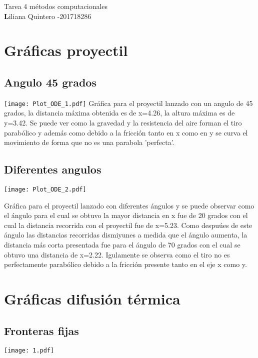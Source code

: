 \documentclass[a4paper,11pt]{article}
\begin{document}
\begin{center}
{\Large Tarea 4 m\'etodos computacionales} \\
{\textbf Liliana Quintero -201718286}
\end{center}


\noindent
\section{Gr\'aficas proyectil}

\subsection{Angulo 45 grados}

\begin{center}
\texttt{[image: Plot\_ODE\_1.pdf]} 
Gr\'afica para el proyectil lanzado con un angulo de 45 grados, la distancia m\'axima obtenida es de x=4.26, la altura m\'axima es de y=3.42. Se puede ver como la gravedad y la resistencia del aire forman el tiro parab\'olico y adem\'as como debido a la fricci\'on tanto en x como en y se curva el movimiento de forma que no es una parabola 'perfecta'.
\end{center}

\subsection{Diferentes angulos}

\begin{center}
\texttt{[image: Plot\_ODE\_2.pdf]}
\end{center}
Gr\'afica para el proyectil lanzado con diferentes \'angulos y se puede observar como el \'angulo para el cual se obtuvo la mayor distancia en x fue de 20 grados con el cual la distancia recorrida con el proyectil fue de x=5.23. Como despu\'ues de este \'angulo las distancias recorridas dismiyunes a medida que el \'angulo aumenta, la distancia m\'as corta presentada fue para el \'angulo de 70 grados con el cual se obtuvo una distancia de x=2.22.  Igulamente se observa como el tiro no es perfectamente parab\'olico debido a la fricci\'on presente tanto en el eje x como y.

\section{Gr\'aficas difusi\'on t\'ermica}

\subsection{Fronteras fijas}
\begin{center}
\texttt{[image: 1.pdf]}
\end{center}
\end{document}

